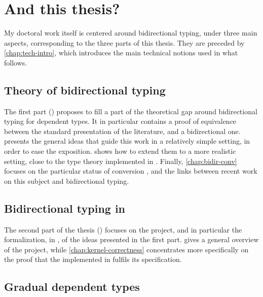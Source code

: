 \section{And this thesis?}
\label{sec:this-thesis}

My doctoral work itself is centered around bidirectional typing, under three main aspects,
corresponding to the three parts of this thesis.
They are preceded by \cref{chap:tech-intro}, which introduces the main technical notions
used in what follows.

\subsection{Theory of bidirectional typing}

The first part () proposes to fill a part of the theoretical gap around
bidirectional typing for dependent types. It in particular contains a proof of equivalence
between the standard presentation of the literature, and a bidirectional one.
 presents the general ideas that guide this work in a relatively
simple setting, in order to ease the exposition.  shows how to extend
them to a more realistic setting, close to the type theory implemented in .
Finally, \cref{chap:bidir-conv} focuses on the particular status of conversion%
,
and the links between recent work on this subject and bidirectional typing.

\subsection{Bidirectional typing in }

The second part of the thesis () focuses on the  project,
and in particular the formalization, in , of the ideas presented in the first part.
 gives a general overview of the project, while
\cref{chap:kernel-correctness} concentrates more specifically on the proof that the
 implemented in  fulfils its specification.

\subsection{Gradual dependent types}

